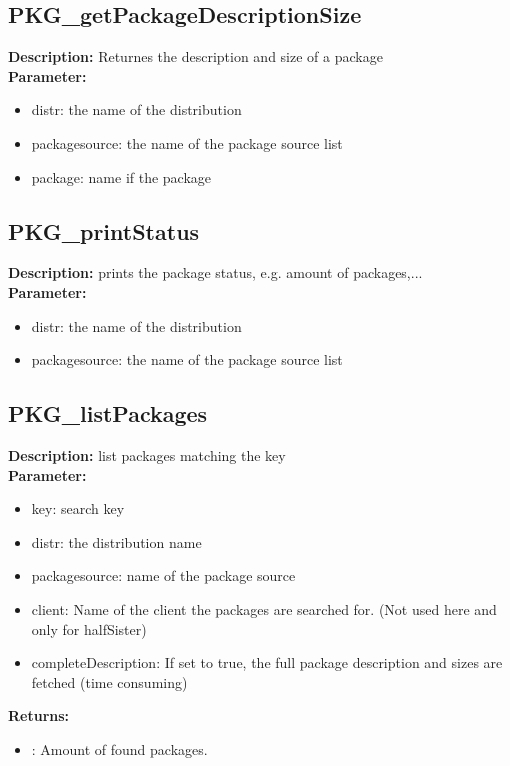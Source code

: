 \subsection{PKG\_getPackageDescriptionSize}
\textbf{Description:} Returnes the description and size of a package\\
\textbf{Parameter:}
\begin{itemize}
\item distr: the name of the distribution
\item packagesource: the name of the package source list
\item package: name if the package
\end{itemize}

\subsection{PKG\_printStatus}
\textbf{Description:} prints the package status, e.g. amount of packages,...\\
\textbf{Parameter:}
\begin{itemize}
\item distr: the name of the distribution
\item packagesource: the name of the package source list
\end{itemize}

\subsection{PKG\_listPackages}
\textbf{Description:} list packages matching the key\\
\textbf{Parameter:}
\begin{itemize}
\item key: search key
\item distr: the distribution name
\item packagesource: name of the package source
\item client: Name of the client the packages are searched for. (Not used here and only for halfSister)
\item completeDescription: If set to true, the full package description and sizes are fetched (time consuming)
\end{itemize}
\textbf{Returns:}
\begin{itemize}
\item : Amount of found packages.
\end{itemize}

